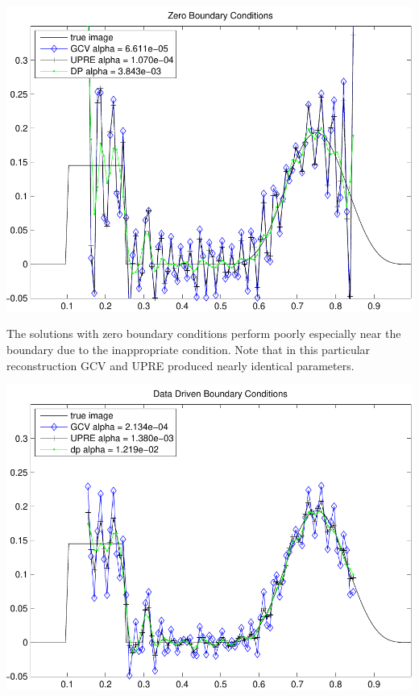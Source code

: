 \documentclass{homework}
\begin{document}
\begin{solution}
\begin{minipage}{.45\textwidth}
\includegraphics[width=\textwidth]{zero_bc_recon.pdf}
\end{minipage} 
\begin{minipage}{.45\textwidth}
The solutions with zero boundary conditions perform poorly especially near the boundary due to the inappropriate condition.
Note that in this particular reconstruction GCV and UPRE produced nearly identical parameters.
\end{minipage}
\noindent
\begin{minipage}{.45\textwidth}
\includegraphics[width=\textwidth]{data_bc_recon.pdf}

\end{minipage}
\end{solution}
\end{document}
